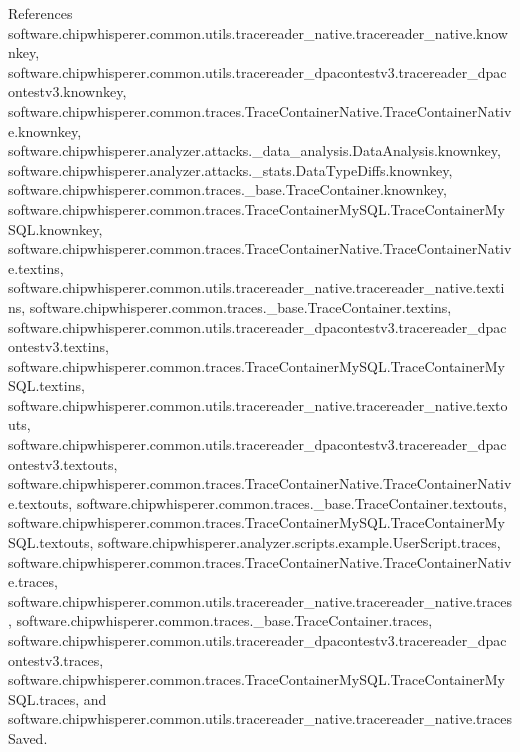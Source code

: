 References software.\+chipwhisperer.\+common.\+utils.\+tracereader\+\_\+native.\+tracereader\+\_\+native.\+knownkey, software.\+chipwhisperer.\+common.\+utils.\+tracereader\+\_\+dpacontestv3.\+tracereader\+\_\+dpacontestv3.\+knownkey, software.\+chipwhisperer.\+common.\+traces.\+Trace\+Container\+Native.\+Trace\+Container\+Native.\+knownkey, software.\+chipwhisperer.\+analyzer.\+attacks.\+\_\+data\+\_\+analysis.\+Data\+Analysis.\+knownkey, software.\+chipwhisperer.\+analyzer.\+attacks.\+\_\+stats.\+Data\+Type\+Diffs.\+knownkey, software.\+chipwhisperer.\+common.\+traces.\+\_\+base.\+Trace\+Container.\+knownkey, software.\+chipwhisperer.\+common.\+traces.\+Trace\+Container\+My\+S\+Q\+L.\+Trace\+Container\+My\+S\+Q\+L.\+knownkey, software.\+chipwhisperer.\+common.\+traces.\+Trace\+Container\+Native.\+Trace\+Container\+Native.\+textins, software.\+chipwhisperer.\+common.\+utils.\+tracereader\+\_\+native.\+tracereader\+\_\+native.\+textins, software.\+chipwhisperer.\+common.\+traces.\+\_\+base.\+Trace\+Container.\+textins, software.\+chipwhisperer.\+common.\+utils.\+tracereader\+\_\+dpacontestv3.\+tracereader\+\_\+dpacontestv3.\+textins, software.\+chipwhisperer.\+common.\+traces.\+Trace\+Container\+My\+S\+Q\+L.\+Trace\+Container\+My\+S\+Q\+L.\+textins, software.\+chipwhisperer.\+common.\+utils.\+tracereader\+\_\+native.\+tracereader\+\_\+native.\+textouts, software.\+chipwhisperer.\+common.\+utils.\+tracereader\+\_\+dpacontestv3.\+tracereader\+\_\+dpacontestv3.\+textouts, software.\+chipwhisperer.\+common.\+traces.\+Trace\+Container\+Native.\+Trace\+Container\+Native.\+textouts, software.\+chipwhisperer.\+common.\+traces.\+\_\+base.\+Trace\+Container.\+textouts, software.\+chipwhisperer.\+common.\+traces.\+Trace\+Container\+My\+S\+Q\+L.\+Trace\+Container\+My\+S\+Q\+L.\+textouts, software.\+chipwhisperer.\+analyzer.\+scripts.\+example.\+User\+Script.\+traces, software.\+chipwhisperer.\+common.\+traces.\+Trace\+Container\+Native.\+Trace\+Container\+Native.\+traces, software.\+chipwhisperer.\+common.\+utils.\+tracereader\+\_\+native.\+tracereader\+\_\+native.\+traces, software.\+chipwhisperer.\+common.\+traces.\+\_\+base.\+Trace\+Container.\+traces, software.\+chipwhisperer.\+common.\+utils.\+tracereader\+\_\+dpacontestv3.\+tracereader\+\_\+dpacontestv3.\+traces, software.\+chipwhisperer.\+common.\+traces.\+Trace\+Container\+My\+S\+Q\+L.\+Trace\+Container\+My\+S\+Q\+L.\+traces, and software.\+chipwhisperer.\+common.\+utils.\+tracereader\+\_\+native.\+tracereader\+\_\+native.\+traces\+Saved.


